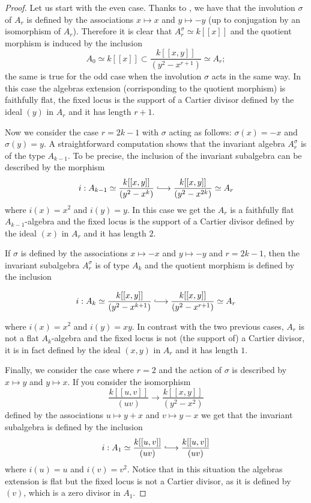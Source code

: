 \documentclass{alggeom}
\numberwithin{equation}{section}
\numberwithin{subsection}{section}
\theoremstyle{definition}
\theoremstyle{remark}
\newcommand{\hooklongrightarrow}{\lhook\joinrel\longrightarrow}
\begin{document}
\begin{proof}
Let us start with the even case. Thanks to , we have that the involution $\sigma$ of $A_r$ is defined by the associations $x\mapsto x$ and $y\mapsto -y$ (up to conjugation by an isomorphism of $A_r$). Therefore it is clear that $A_r^{\sigma} \simeq  k[[x]]$ and the quotient morphism is induced by the inclusion $$A_0 \simeq k[[x]] \subset \frac{k[[x,y]]}{(y^2-x^{r+1})} \simeq A_r;$$
 the same is true for the odd case when the involution $\sigma$ acts in the same way. In this case the algebras extension (corrisponding to the quotient morphism) is faithfully flat, the fixed locus is the support of a Cartier divisor defined by the ideal $(y)$ in $A_r$ and it has length $r+1$.

Now we consider the case $r=2k-1$ with $\sigma$ acting as follows: $\sigma(x)=-x$ and $\sigma(y)=y$. A straightforward computation shows that the invariant algebra $A_r^{\sigma}$ is of the type $A_{k-1}$. To be precise, the inclusion of the invariant subalgebra can be described by the morphism
$$ i: A_{k-1}\simeq\frac{k[[x,y]]}{(y^2-x^{k})} \hooklongrightarrow \frac{k[[x,y]]}{(y^2-x^{2k})}\simeq A_r$$ 
where $i(x)=x^2$ and $i(y)=y$. In this case we get the $A_r$ is a faithfully flat $A_{k-1}$-algebra and the fixed locus is the support of a Cartier divisor defined by the ideal $(x)$ in $A_r$ and it has length $2$.

If $\sigma$ is defined by the associations $x\mapsto -x$ and $y \mapsto -y$ and $r=2k-1$, then the invariant subalgebra $A_r^{\sigma}$ is of type $A_k$ and the quotient morphism is defined by the inclusion

$$ i: A_k\simeq \frac{k[[x,y]]}{(y^2-x^{k+1})} \hooklongrightarrow \frac{k[[x,y]]}{(y^2-x^{r+1})}\simeq A_r $$

where $i(x)=x^2$ and $i(y)=xy$. In contrast with the two previous cases, $A_r$ is not a flat $A_k$-algebra and the fixed locus is not (the support of) a Cartier divisor, it is in fact defined by the ideal $(x,y)$ in $A_r$ and it has length $1$. 

Finally, we consider the case where $r=2$ and the action of $\sigma$ is described by $x\mapsto y$ and $y \mapsto x$. If you consider the isomorphism 
$$ \frac{k[[u,v]]}{(uv)} \rightarrow  \frac{k[[x,y]]}{(y^2-x^2)}$$
defined by the associations $u\mapsto y+x$ and $v\mapsto y-x$  we get that the invariant subalgebra is defined by the inclusion 
$$ i: A_1\simeq \frac{k[[u,v]]}{(uv)} \hooklongrightarrow \frac{k[[u,v]]}{(uv)}$$ 
where $i(u)=u$ and $i(v)=v^2$. Notice that in this situation the algebras extension is flat but the fixed locus is not a Cartier divisor, as it is defined by $(v)$, which is a zero divisor in $A_1$.
\end{proof}
\end{document}
